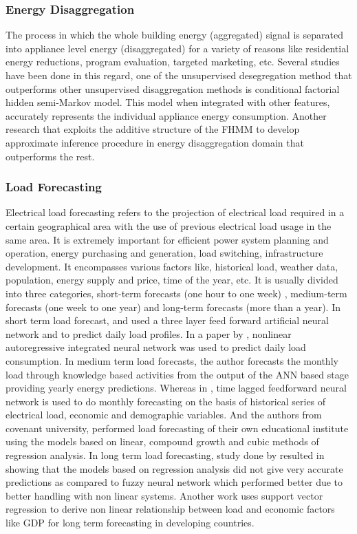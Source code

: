 \documentclass{sig-alternate}
\begin{document}
\subsubsection{Energy Disaggregation}
The process in which the whole building energy (aggregated) signal is separated into appliance level energy (disaggregated) for a variety of reasons like residential energy reductions, program evaluation, targeted marketing, etc. Several studies have been done in this regard, one of the unsupervised desegregation method \cite{DisaggregationHSMM} that outperforms other unsupervised disaggregation methods is conditional factorial hidden semi-Markov model. This model when integrated with other features, accurately represents the individual appliance energy consumption. Another research \cite{KolterJ12} that exploits the additive structure of the FHMM to develop approximate inference procedure in  energy disaggregation domain that outperforms the rest.

\subsubsection{Load Forecasting}
Electrical load forecasting refers to the projection of electrical load required in a certain geographical area with the use of previous electrical load usage in the same area. It is extremely important for efficient power system planning and operation, energy purchasing and generation, load switching, infrastructure development. It encompasses various factors like, historical load, weather data, population, energy supply and price, time of the year, etc.
It is usually divided into three categories, short-term forecasts (one hour to one week) , medium-term forecasts (one week to one year) and long-term forecasts (more than a year).
In short term load forecast, \cite{Bakirtzis} and \cite{Chen} used a three layer feed forward artificial neural network and to predict daily load profiles. In a paper by \cite{Chow}, nonlinear autoregressive integrated neural network was used to predict daily load consumption.
In medium term load forecasts, the author forecasts \cite{Falvo} the monthly load through knowledge based activities from the output of the ANN based stage providing yearly energy predictions. Whereas in \cite{bassi}, time lagged feedforward neural network is used to do monthly forecasting on the basis of historical series of electrical load, economic and demographic variables. And the authors from covenant university, \cite{samuel} performed load forecasting of their own educational institute using the models based on linear, compound growth and cubic methods of regression analysis.
In long term load forecasting, study done by \cite{Daneshi} resulted in showing that the models based on regression analysis did not give very accurate predictions as compared to fuzzy neural network which performed better due to better handling with non linear systems. Another work  \cite{Zhang} uses support vector regression to derive non linear relationship between load and economic factors like GDP for long term forecasting in developing countries.
\end{document}
